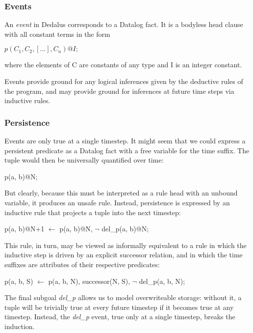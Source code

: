 \subsubsection{Events}

An \emph{event} in Dedalus corresponds to a Datalog fact.  It is a bodyless head clause with all constant terms in the form


$p(C_{1},C_{2},[...],C_{n})@I;$


where the elements of C are constants of any type and I is an integer constant.

Events provide ground for any logical inferences given by the deductive rules of the program, and may provide ground for inferences at 
future time steps via inductive rules.



\subsubsection{Persistence}

Events are only true at a single timestep.  It might seem that we could express a persistent predicate as a Datalog fact with a free variable 
for the time suffix.  The tuple would then be universally quantified over time:

\begin{Dedalus}
p(a, b)@N;
\end{Dedalus}

But clearly, because this must be interpreted as a rule head with an unbound variable, it produces an unsafe rule.  Instead, persistence is
expressed by an inductive rule that projects a tuple into the next timestep:

\begin{Dedalus}
p(a, b)@N+1 \(\leftarrow\)
  p(a, b)@N, 
  \(\lnot\) del\_p(a, b)@N;
\end{Dedalus}

This rule, in turn, may be viewed as informally equivalent to a rule in which the inductive step is driven by an 
explicit successor relation, and in which the time suffixes are attributes of their respective predicates:

\begin{Dedalus}
p(a, b, S) \(\leftarrow\)
  p(a, b, N),
  successor(N, S), 
  \(\lnot\) del\_p(a, b, N);
\end{Dedalus}

The final subgoal \emph{del\_p} allows us to model overwriteable storage: without it, a tuple will be trivially true at every future timestep if it becomes true
at any timestep.  Instead, the \emph{del\_p} event, true only at a single timestep, breaks the induction.

